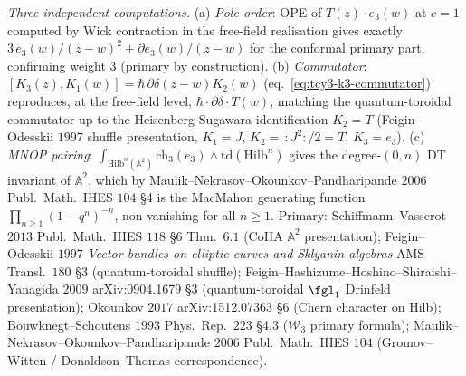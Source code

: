 \begin{proposition}
\emph{Three independent computations.}
(a) \emph{Pole order}: OPE of $T(z)\cdot e_3(w)$ at $c=1$ computed by
Wick contraction in the free-field realisation gives exactly
$3\,e_3(w)/(z-w)^2 + \partial e_3(w)/(z-w)$ for the conformal primary
part, confirming weight $3$ (primary by construction).
(b) \emph{Commutator}: $[K_3(z), K_1(w)] = \hbar\,\partial\delta(z-w)
K_2(w)$ (eq.~\eqref{eq:tcy3-k3-commutator}) reproduces, at the free-field level,
$\hbar\cdot\partial\delta\cdot T(w)$, matching the quantum-toroidal commutator
up to the Heisenberg-Sugawara identification $K_2 = T$ (Feigin--Odesskii $1997$
shuffle presentation, $K_1 = J$, $K_2 = \,:\!J^2\!:/2 = T$, $K_3 = e_3$).
(c) \emph{MNOP pairing}: $\int_{\mathrm{Hilb}^n(\mathbb A^2)}
\mathrm{ch}_3(e_3)\wedge\mathrm{td}(\mathrm{Hilb}^n)$
gives the degree-$(0,n)$ DT invariant of $\mathbb A^2$, which by
Maulik--Nekrasov--Okounkov--Pandharipande $2006$ Publ.\ Math.\ IHES $104$
\S4 is the MacMahon generating function $\prod_{n\geq 1}(1-q^n)^{-n}$,
non-vanishing for all $n\geq 1$.
Primary: Schiffmann--Vasserot $2013$ Publ.\ Math.\ IHES $118$ \S6
Thm.\ $6.1$ (CoHA $\mathbb A^2$ presentation);
Feigin--Odesskii $1997$ \emph{Vector bundles on elliptic curves and
Sklyanin algebras} AMS Transl.\ $180$ \S3 (quantum-toroidal shuffle);
Feigin--Hashizume--Hoshino--Shiraishi--Yanagida $2009$ arXiv:0904.1679
\S3 (quantum-toroidal $\fgl_1$ Drinfeld presentation);
Okounkov $2017$ arXiv:1512.07363 \S6 (Chern character on Hilb);
Bouwknegt--Schoutens $1993$ Phys.\ Rep.\ $223$ \S4.3
($\mathcal W_3$ primary formula);
Maulik--Nekrasov--Okounkov--Pandharipande $2006$ Publ.\ Math.\ IHES $104$
(Gromov--Witten / Donaldson--Thomas correspondence).
\end{proposition}

